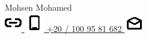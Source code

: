 {
  \noindent
  \fontsize{27pt}{27pt}\blackColor\optifont
  Mohsen Mohamed
} \\
%
\href{https://\domain}{
  \includegraphics[align=c]{assets/icons/url.eps}
  \quad\domain
}
%
\quad\quad
\href{tel:+201009581682}{
  \includegraphics[align=c]{assets/icons/phone.eps}
  \enspace +20 / 100 95 81 682
}
%
\quad\quad
\href{mailto:\email}{
  \includegraphics[align=c]{assets/icons/email.eps}
  \enspace\email
}